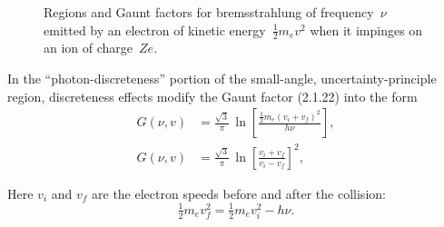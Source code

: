 \begin{figure}[htbp]
\centering
\caption{Regions and Gaunt factors for bremsstrahlung of frequency~$\nu$
emitted by an electron of kinetic energy~$\tfrac{1}{2}m_e v^{2}$
when it impinges on an ion of charge~$Ze$.}
\label{fig:2.1.1}
\end{figure}

In the ``photon-discreteness'' portion of the small-angle, uncertainty-principle
region, discreteness effects modify the Gaunt factor (2.1.22) into the form
\begin{subequations}
\begin{align}
G(\nu,v) &= \frac{\sqrt{3}}{\pi}\,
\ln\!\left[\frac{\frac{1}{2}m_e(v_i + v_f)^2}{h\nu}\right],
\tag{2.1.24a}\\[6pt]
G(\nu,v) &= \frac{\sqrt{3}}{\pi}\,
\ln\!\left[\frac{v_i + v_f}{v_i - v_f}\right]^2,
\tag{2.1.24b}
\end{align}
\end{subequations}

Here $v_i$ and $v_f$ are the electron speeds before and after the collision:
\begin{equation}
\tfrac{1}{2}m_e v_f^2 = \tfrac{1}{2}m_e v_i^2 - h\nu.
\end{equation}

